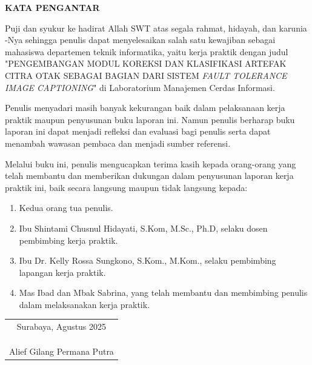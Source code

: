 
\begin{center}
  \Large\textbf{KATA PENGANTAR}
\end{center}
\vspace{2ex}


Puji dan syukur ke hadirat Allah SWT atas segala rahmat, hidayah, dan karunia -Nya sehingga penulis dapat menyelesaikan salah satu kewajiban sebagai mahasiswa departemen teknik informatika, yaitu kerja praktik dengan judul "PENGEMBANGAN MODUL KOREKSI DAN KLASIFIKASI ARTEFAK CITRA OTAK SEBAGAI BAGIAN DARI SISTEM \textit{FAULT TOLERANCE IMAGE CAPTIONING}" di Laboratorium Manajemen Cerdas Informasi.

Penulis menyadari masih banyak kekurangan baik dalam pelaksanaan kerja praktik maupun penyusunan buku laporan ini. Namun penulis berharap buku laporan ini dapat menjadi refleksi dan evaluasi bagi penulis serta dapat menambah wawasan pembaca dan menjadi sumber referensi.

Melalui buku ini, penulis mengucapkan terima kasih kepada orang-orang yang telah membantu dan memberikan dukungan dalam penyusunan laporan kerja praktik ini, baik secara langsung maupun tidak langsung kepada:

\begin{enumerate}[nolistsep]

  \item Kedua orang tua penulis.

  \item Ibu Shintami Chusnul Hidayati, S.Kom, M.Sc., Ph.D, selaku dosen pembimbing kerja praktik. 

  \item Ibu Dr. Kelly Rossa Sungkono, S.Kom., M.Kom., selaku pembimbing lapangan kerja praktik.
  
  \item Mas Ibad dan Mbak Sabrina, yang telah membantu dan membimbing penulis dalam melaksanakan kerja praktik.

\end{enumerate}


\begin{flushright}
  \begin{tabular}[b]{c}
    Surabaya, Agustus 2025
    \\
    \\
    \\
    \\
    Alief Gilang Permana Putra
  \end{tabular}
\end{flushright}
